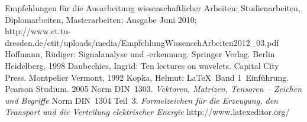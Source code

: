 
 \begin{thebibliography}{99}
Empfehlungen für die Ausarbeitung wissenschaftlicher Arbeiten; Studienarbeiten, Diplomarbeiten, Masterarbeiten; Ausgabe Juni 2010;\\
\footnotesize http://www.et.tu-dresden.de/etit/uploads/media/EmpfehlungWissenschArbeiten2012\_03.pdf
\normalsize
{}Hoffmann, Rüdiger: Signalanalyse und -erkennung. Springer Verlag. Berlin Heidelberg, 1998
Daubechies, Ingrid: Ten lectures on wavelets. Capital City Press. Montpelier Vermont, 1992
Kopka, Helmut: \LaTeX~Band 1~Einführung. Pearson Studium. 2005
Norm DIN~1303. \emph{Vektoren, Matrizen, Tensoren -- Zeichen und Begriffe}
Norm DIN~1304 Teil~3. \emph{Formelzeichen für die Erzeugung, den Transport und die Verteilung elektrischer Energie}
http://www.latexeditor.org/
\end{thebibliography}
